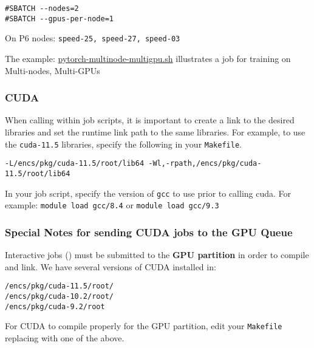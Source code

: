 \begin{verbatim}
#SBATCH --nodes=2
#SBATCH --gpus-per-node=1
\end{verbatim}

On P6 nodes: \texttt{speed-25, speed-27, speed-03}

The example: 
  \href{https://github.com/NAG-DevOps/speed-hpc/blob/master/src/pytorch-multinode-multigpu.sh}
  {pytorch-multinode-multigpu.sh}
illustrates a job for training on Multi-nodes, Multi-GPUs

\subsubsection{CUDA}

When calling  within job scripts, it is important to create a link to
the desired  libraries and set the runtime link path to the same libraries. 
For example, to use the \texttt{cuda-11.5} libraries, specify the following in 
your \texttt{Makefile}.

\begin{verbatim}
-L/encs/pkg/cuda-11.5/root/lib64 -Wl,-rpath,/encs/pkg/cuda-11.5/root/lib64
\end{verbatim}

In your job script, specify the version of \texttt{gcc} to use prior to calling 
cuda. For example: 
   \texttt{module load gcc/8.4}
or
   \texttt{module load gcc/9.3}

\subsubsection{Special Notes for sending CUDA jobs to the GPU Queue}

Interactive 
jobs () must be submitted to the \textbf{GPU partition} in order to compile 
and link.
%
We have several versions of CUDA installed in:
\begin{verbatim}
/encs/pkg/cuda-11.5/root/
/encs/pkg/cuda-10.2/root/
/encs/pkg/cuda-9.2/root
\end{verbatim}

For CUDA to compile properly for the GPU partition, edit your \texttt{Makefile}
replacing  with one of the above.


